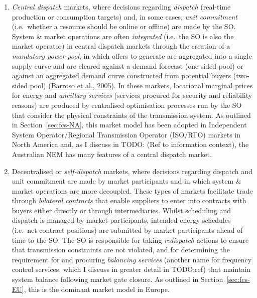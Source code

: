 \documentclass[12pt,a4paper,]{report}
\begin{document}
\begin{enumerate}
\def\labelenumi{\arabic{enumi}.}
\item
  \emph{Central dispatch} markets, where decisions regarding
  \emph{dispatch} (real-time production or consumption targets) and, in
  some cases, \emph{unit commitment} (i.e.~whether a resource should be
  online or offline) are made by the SO. System \& market operations are
  often \emph{integrated} (i.e.~the SO is also the market operator) in
  central dispatch markets through the creation of a \emph{mandatory
  power pool}, in which offers to generate are aggregated into a single
  supply curve and are cleared against a demand forecast (one-sided
  pool) or against an aggregated demand curve constructed from potential
  buyers (two-sided pool)
  (\protect\hyperlink{ref-barrosoClassificationElectricityMarket2005}{Barroso
  et al., 2005}). In these markets, locational marginal prices for
  energy and \emph{ancillary services} (services procured for security
  and reliability reasons) are produced by centralised optimisation
  processes run by the SO that consider the physical constraints of the
  transmission system. As outlined in Section~\ref{sec:fcs-NA}, this
  market model has been adopted in Independent System Operator/Regional
  Transmission Operator (ISO/RTO) markets in North America and, as I
  discuss in TODO: (Ref to information context), the Australian NEM has
  many features of a central dispatch market.
\item
  Decentralised or \emph{self-dispatch} markets, where decisions
  regarding dispatch and unit commitment are made by market participants
  and in which system \& market operations are more decoupled. These
  types of markets facilitate trade through \emph{bilateral contracts}
  that enable suppliers to enter into contracts with buyers either
  directly or through intermediaries. Whilst scheduling and dispatch is
  managed by market participants, intended energy schedules (i.e.~net
  contract positions) are submitted by market participants ahead of time
  to the SO. The SO is responsible for taking \emph{redispatch} actions
  to ensure that transmission constraints are not violated, and for
  determining the requirement for and procuring \emph{balancing
  services} (another name for frequency control services, which I
  discuss in greater detail in TODO:ref) that maintain system balance
  following market gate closure. As outlined in
  Section~\ref{sec:fcs-EU}, this is the dominant market model in Europe.
\end{enumerate}
\end{document}
